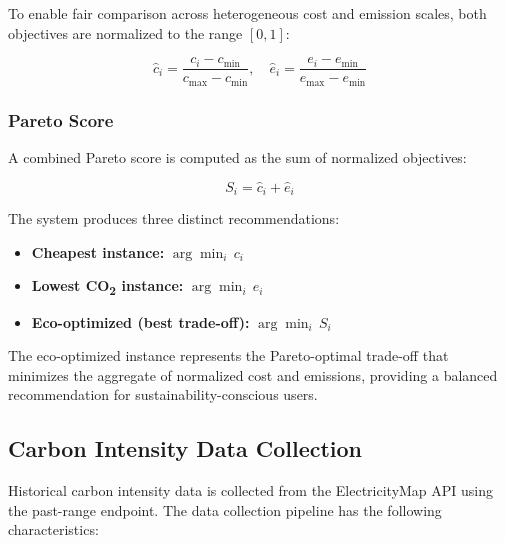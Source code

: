 \documentclass[12pt]{article}
\begin{document}
To enable fair comparison across heterogeneous cost and emission scales, both objectives are normalized to the range $[0, 1]$:

\begin{equation}
\hat{c}_i = \frac{c_i - c_{\min}}{c_{\max} - c_{\min}}, \quad \hat{e}_i = \frac{e_i - e_{\min}}{e_{\max} - e_{\min}}
\label{eq:normalize}
\end{equation}

\subsubsection{Pareto Score}

A combined Pareto score is computed as the sum of normalized objectives:

\begin{equation}
S_i = \hat{c}_i + \hat{e}_i
\label{eq:pareto_score}
\end{equation}

The system produces three distinct recommendations:
\begin{itemize}
    \item \textbf{Cheapest instance:} $\arg\min_i \, c_i$
    \item \textbf{Lowest CO\textsubscript{2} instance:} $\arg\min_i \, e_i$
    \item \textbf{Eco-optimized (best trade-off):} $\arg\min_i \, S_i$
\end{itemize}

The eco-optimized instance represents the Pareto-optimal trade-off that minimizes the aggregate of normalized cost and emissions, providing a balanced recommendation for sustainability-conscious users.

\subsection{Carbon Intensity Data Collection}

Historical carbon intensity data is collected from the ElectricityMap API \citep{b9} using the past-range endpoint. The data collection pipeline has the following characteristics:
\end{document}
